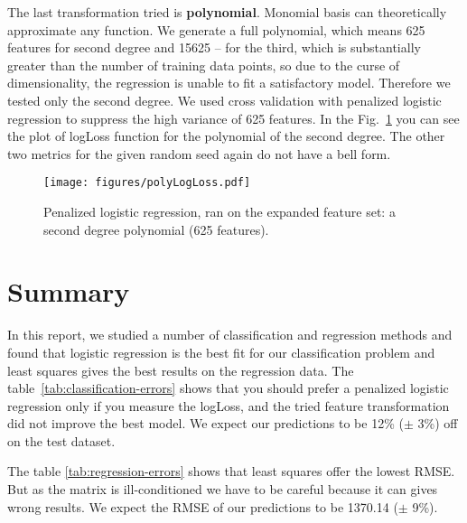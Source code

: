 \documentclass{article} %
\begin{document}
The last transformation tried is {\bf polynomial}. Monomial basis can theoretically approximate any function. We generate a full polynomial, which means 625 features for second degree and 15625 -- for the third, which is substantially greater than the number of training data points, so due to the curse of dimensionality, the regression is unable to fit a satisfactory model. Therefore we tested only the second degree. We used cross validation with penalized logistic regression to suppress the high variance of 625 features. In the Fig.~\ref{fig:polyErrors} you can see the plot of logLoss function for the polynomial of the second degree. The other two metrics for the given random seed again do not have a bell form.

\begin{figure}[h]
\center
\texttt{[image: figures/polyLogLoss.pdf]}
\caption{Penalized logistic regression, ran on the expanded feature set: a second degree polynomial (625 features).}
\label{fig:polyErrors}
\end{figure}

\section{Summary}

In this report, we studied a number of classification and regression methods and found that logistic regression is the best fit for our classification problem and least squares gives the best results on the regression data. The table~\ref{tab:classification-errors} shows that you should prefer a penalized logistic regression only if you measure the logLoss, and the tried feature transformation did not improve the best model. We expect our predictions to be 12\% ($\pm$ 3\%) off on the test dataset.

The table \ref{tab:regression-errors} shows that least squares offer the lowest RMSE. But as the matrix is ill-conditioned we have to be careful because it can gives wrong results. 
We expect the RMSE of our predictions to be 1370.14 ($\pm$ 9\%).
\end{document}
